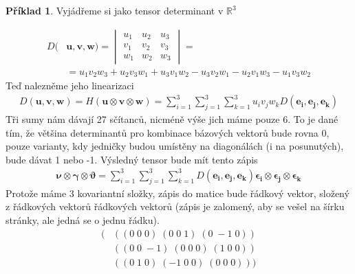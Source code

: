 \documentclass[a5paper,12pt]{amsbook}
\theoremstyle{definition}
\newtheorem{example}{Příklad}[chapter]
\newcommand{\myvec}[1]{\bm{#1}}
\newcommand{\myspace}[1]{\mathbb{#1}}
\begin{document}
\begin{example}
Vyjádřeme si jako tensor determinant v $\myspace{R}^3$

\begin{equation*}
\begin{split}
D(&\myvec{u}, \myvec{v}, \myvec{w}) =
\begin{vmatrix}
u_1 & u_2 & u_3 \\
v_1 & v_2 & v_3 \\
w_1 & w_2 & w_3
\end{vmatrix} = \\
&= u_1v_2w_3 + u_2v_3w_1 + u_3v_1w_2 - u_3v_2w_1 - u_2v_1w_3 - u_1v_3w_2
\end{split}
\end{equation*}
Teď nalezněme jeho linearizaci
\begin{equation*}
\begin{split}
D(\myvec{u}, \myvec{v}, \myvec{w}) = H(\myvec{u}\otimes\myvec{v}\otimes\myvec{w})
  = \sum_{i=1}^{3}\sum_{j=1}^{3}\sum_{k=1}^{3}u_i v_j w_k D(\myvec{e_i}, \myvec{e_j}, \myvec{e_k})
\end{split}
\end{equation*}
Tři sumy nám dávají 27 sčítanců, nicméně výše jich máme pouze 6. To je dané tím, že většina
determinantů pro kombinace bázových vektorů bude rovna 0, pouze varianty, kdy jedničky budou umístěny
na diagonálách (i na posunutých), bude dávat 1 nebo -1. Výsledný tensor bude mít tento zápis
\begin{equation*}
\begin{split}
\myvec{\nu}\otimes\myvec{\gamma}\otimes\myvec{\vartheta} =
  \sum_{i=1}^{3}\sum_{j=1}^{3}\sum_{k=1}^{3} D(\myvec{e_i}, \myvec{e_j}, \myvec{e_k})
    \myvec{\epsilon_i}\otimes\myvec{\epsilon_j}\otimes\myvec{\epsilon_k}
\end{split}
\end{equation*}
Protože máme 3 kovariantní složky, zápis do matice bude řádkový vektor, složený z řádkových vektorů
řádkových vektorů (zápis je zalomený, aby se vešel na šírku stránky, ale jedná se o jednu řádku).
\begin{equation*}
\begin{split}
(&((0\;0\;0)\;(0\;0\;1)\;(0\;-1\;0))\\
 &((0\;0\;-1)\;(0\;0\;0)\;(1\;0\;0))\\
 &((0\;1\;0)\;(-1\;0\;0)\;(0\;0\;0)))
\end{split}
\end{equation*}
\end{example}
\end{document}
